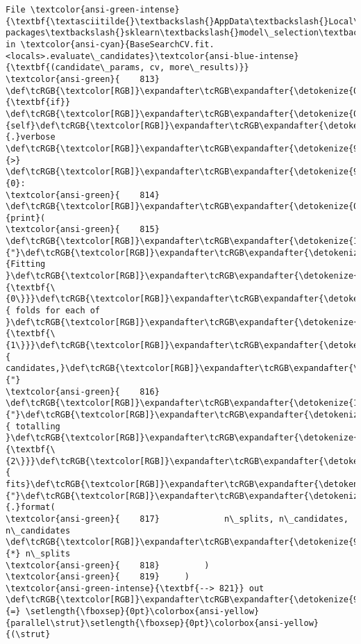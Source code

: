 \documentclass[11pt]{article}
\begin{document}
\begin{Verbatim}[commandchars=\\\{\}, frame=single, framerule=2mm, rulecolor=\color{outerrorbackground}]
File \textcolor{ansi-green-intense}{\textbf{\textasciitilde{}\textbackslash{}AppData\textbackslash{}Local\textbackslash{}anaconda3\textbackslash{}lib\textbackslash{}site-packages\textbackslash{}sklearn\textbackslash{}model\_selection\textbackslash{}\_search.py:821}}, in \textcolor{ansi-cyan}{BaseSearchCV.fit.<locals>.evaluate\_candidates}\textcolor{ansi-blue-intense}{\textbf{(candidate\_params, cv, more\_results)}}
\textcolor{ansi-green}{    813} \def\tcRGB{\textcolor[RGB]}\expandafter\tcRGB\expandafter{\detokenize{0,135,0}}{\textbf{if}} \def\tcRGB{\textcolor[RGB]}\expandafter\tcRGB\expandafter{\detokenize{0,135,0}}{self}\def\tcRGB{\textcolor[RGB]}\expandafter\tcRGB\expandafter{\detokenize{98,98,98}}{.}verbose \def\tcRGB{\textcolor[RGB]}\expandafter\tcRGB\expandafter{\detokenize{98,98,98}}{>} \def\tcRGB{\textcolor[RGB]}\expandafter\tcRGB\expandafter{\detokenize{98,98,98}}{0}:
\textcolor{ansi-green}{    814}     \def\tcRGB{\textcolor[RGB]}\expandafter\tcRGB\expandafter{\detokenize{0,135,0}}{print}(
\textcolor{ansi-green}{    815}         \def\tcRGB{\textcolor[RGB]}\expandafter\tcRGB\expandafter{\detokenize{175,0,0}}{"}\def\tcRGB{\textcolor[RGB]}\expandafter\tcRGB\expandafter{\detokenize{175,0,0}}{Fitting }\def\tcRGB{\textcolor[RGB]}\expandafter\tcRGB\expandafter{\detokenize{175,95,135}}{\textbf{\{0\}}}\def\tcRGB{\textcolor[RGB]}\expandafter\tcRGB\expandafter{\detokenize{175,0,0}}{ folds for each of }\def\tcRGB{\textcolor[RGB]}\expandafter\tcRGB\expandafter{\detokenize{175,95,135}}{\textbf{\{1\}}}\def\tcRGB{\textcolor[RGB]}\expandafter\tcRGB\expandafter{\detokenize{175,0,0}}{ candidates,}\def\tcRGB{\textcolor[RGB]}\expandafter\tcRGB\expandafter{\detokenize{175,0,0}}{"}
\textcolor{ansi-green}{    816}         \def\tcRGB{\textcolor[RGB]}\expandafter\tcRGB\expandafter{\detokenize{175,0,0}}{"}\def\tcRGB{\textcolor[RGB]}\expandafter\tcRGB\expandafter{\detokenize{175,0,0}}{ totalling }\def\tcRGB{\textcolor[RGB]}\expandafter\tcRGB\expandafter{\detokenize{175,95,135}}{\textbf{\{2\}}}\def\tcRGB{\textcolor[RGB]}\expandafter\tcRGB\expandafter{\detokenize{175,0,0}}{ fits}\def\tcRGB{\textcolor[RGB]}\expandafter\tcRGB\expandafter{\detokenize{175,0,0}}{"}\def\tcRGB{\textcolor[RGB]}\expandafter\tcRGB\expandafter{\detokenize{98,98,98}}{.}format(
\textcolor{ansi-green}{    817}             n\_splits, n\_candidates, n\_candidates \def\tcRGB{\textcolor[RGB]}\expandafter\tcRGB\expandafter{\detokenize{98,98,98}}{*} n\_splits
\textcolor{ansi-green}{    818}         )
\textcolor{ansi-green}{    819}     )
\textcolor{ansi-green-intense}{\textbf{--> 821}} out \def\tcRGB{\textcolor[RGB]}\expandafter\tcRGB\expandafter{\detokenize{98,98,98}}{=} \setlength{\fboxsep}{0pt}\colorbox{ansi-yellow}{parallel\strut}\setlength{\fboxsep}{0pt}\colorbox{ansi-yellow}{(\strut}

\end{Verbatim}
\end{document}
